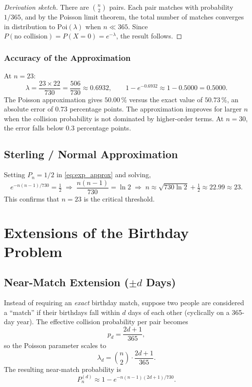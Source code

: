 \documentclass[12pt]{report}
\theoremstyle{definition}
\begin{document}
\begin{proof}[Derivation sketch]
  There are $\binom{n}{2}$ pairs.  Each pair matches with probability $1/365$,
  and by the Poisson limit theorem, the total number of matches converges in distribution
  to $\mathrm{Poi}(\lambda)$ when $n \ll 365$.  Since
  $P(\text{no collision}) = P(X=0) = e^{-\lambda}$, the result follows.
\end{proof}

\subsection{Accuracy of the Approximation}

At $n=23$:
\[
  \lambda = \frac{23 \times 22}{730} = \frac{506}{730} \approx 0.6932,
  \qquad
  1 - e^{-0.6932} \approx 1 - 0.5000 = 0.5000.
\]
The Poisson approximation gives $50.00\,\%$ versus the exact value of $50.73\,\%$,
an absolute error of $0.73$ percentage points.  The approximation improves for larger
$n$ when the collision probability is not dominated by higher-order terms.  At $n=30$,
the error falls below $0.3$ percentage points.

\section{Sterling / Normal Approximation}

Setting $P_n = 1/2$ in \eqref{eq:exp_approx} and solving,
\[
  e^{-n(n-1)/730} = \tfrac{1}{2}
  \;\Longrightarrow\;
  \frac{n(n-1)}{730} = \ln 2
  \;\Longrightarrow\;
  n \approx \sqrt{730\ln 2} + \tfrac{1}{2} \approx 22.99 \approx 23.
\]
This confirms that $n=23$ is the critical threshold.

\chapter{Extensions of the Birthday Problem}

\section{Near-Match Extension ($\pm d$ Days)}

Instead of requiring an \emph{exact} birthday match, suppose two people are considered
a ``match'' if their birthdays fall within $d$ days of each other (cyclically on a
365-day year).  The effective collision probability per pair becomes
\[
  p_d = \frac{2d+1}{365},
\]
so the Poisson parameter scales to
\[
  \lambda_d = \binom{n}{2}\cdot\frac{2d+1}{365}.
\]
The resulting near-match probability is
\begin{equation}\label{eq:nearmatch}
  P_n^{(d)} \approx 1 - e^{-n(n-1)(2d+1)/730}.
\end{equation}
\end{document}
